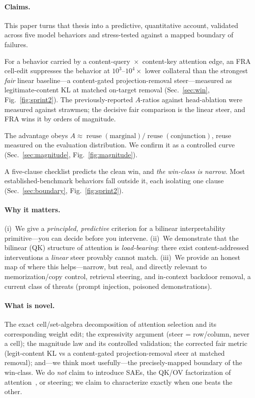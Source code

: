 \documentclass[11pt]{article}
\newcommand{\reuse}{\operatorname{reuse}}
\theoremstyle{definition}
\theoremstyle{plain}
\theoremstyle{remark}
\begin{document}
\paragraph{Claims.} This paper turns that thesis into a predictive, quantitative account, validated across five model behaviors and stress-tested against a mapped boundary of failures.
\begin{description}[leftmargin=1.6em,itemsep=2pt]
  \item[Claim 1 (the win).] For a behavior carried by a content-query~$\times$~content-key attention edge, an FRA cell-edit suppresses the behavior at $10^3$--$10^4\times$ lower collateral than the strongest \emph{fair} linear baseline---a content-gated projection-removal steer---measured as legitimate-content KL at matched on-target removal (Sec.~\ref{sec:win}, Fig.~\ref{fig:sprint2}). The previously-reported $A$-ratios against head-ablation were measured against strawmen; the decisive fair comparison is the linear steer, and FRA wins it by orders of magnitude.
  \item[Claim 2 (the magnitude law).] The advantage obeys $A \approx \reuse(\text{marginal})/\reuse(\text{conjunction})$, reuse measured on the evaluation distribution. We confirm it as a controlled curve (Sec.~\ref{sec:magnitude}, Fig.~\ref{fig:magnitude}).
  \item[Claim 3 (the boundary).] A five-clause checklist predicts the clean win, and \emph{the win-class is narrow}. Most established-benchmark behaviors fall outside it, each isolating one clause (Sec.~\ref{sec:boundary}, Fig.~\ref{fig:sprint2}).
\end{description}

\paragraph{Why it matters.} (i)~We give a \emph{principled, predictive} criterion for a bilinear interpretability primitive---you can decide before you intervene. (ii)~We demonstrate that the bilinear (QK) structure of attention is \emph{load-bearing}: there exist content-addressed interventions a \emph{linear} steer provably cannot match. (iii)~We provide an honest map of where this helps---narrow, but real, and directly relevant to memorization/copy control, retrieval steering, and in-context backdoor removal, a current class of threats (prompt injection, poisoned demonstrations).

\paragraph{What is novel.} The exact cell/set-algebra decomposition of attention selection and its corresponding weight edit; the expressivity argument (steer = row/column, never a cell); the magnitude law and its controlled validation; the corrected fair metric (legit-content KL vs a content-gated projection-removal steer at matched removal); and---we think most usefully---the precisely-mapped boundary of the win-class. We do \emph{not} claim to introduce SAEs, the QK/OV factorization of attention~\citep{elhage2021mathematical}, or steering; we claim to characterize exactly when one beats the other.
\end{document}
